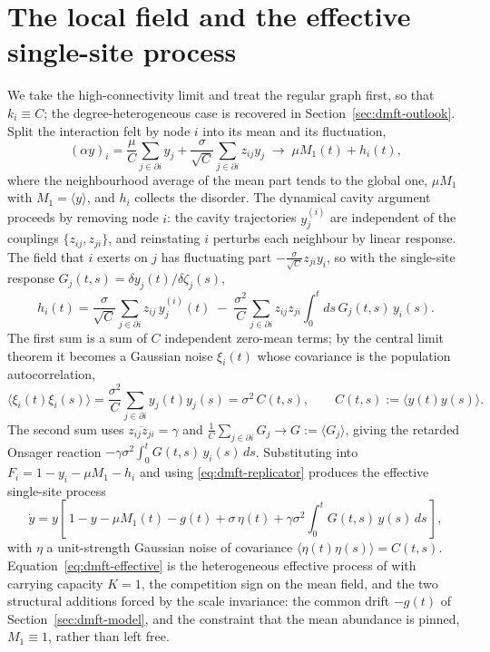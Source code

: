 \section{The local field and the effective single-site process}
\label{sec:dmft-cavity}

We take the high-connectivity limit and treat the regular graph first, so that
$k_i \equiv C$; the degree-heterogeneous case is recovered in
Section~\ref{sec:dmft-outlook}. Split the interaction felt by node $i$ into its mean and
its fluctuation,
\begin{equation}
    (\alpha y)_i
    = \frac{\mu}{C}\sum_{j\in\partial i} y_j + \frac{\sigma}{\sqrt C}\sum_{j\in\partial i} z_{ij} y_j
    \;\longrightarrow\; \mu M_1(t) + h_i(t),
\end{equation}
where the neighbourhood average of the mean part tends to the global one, $\mu M_1$ with
$M_1 = \langle y\rangle$, and $h_i$ collects the disorder. The dynamical cavity argument
\citep{bunin2017,galla2018} proceeds by removing node $i$: the cavity trajectories
$y_j^{(i)}$ are independent of the couplings $\{z_{ij}, z_{ji}\}$, and reinstating $i$
perturbs each neighbour by linear response. The field that $i$ exerts on $j$ has
fluctuating part $-\frac{\sigma}{\sqrt C} z_{ji} y_i$, so with the single-site response
$G_j(t,s) = \delta y_j(t)/\delta\zeta_j(s)$,
\begin{equation}
    h_i(t)
    = \frac{\sigma}{\sqrt C}\sum_{j\in\partial i} z_{ij}\,y_j^{(i)}(t)
    \;-\; \frac{\sigma^2}{C}\sum_{j\in\partial i} z_{ij}z_{ji}\!\int_0^t\! ds\,G_j(t,s)\,y_i(s).
\end{equation}
The first sum is a sum of $C$ independent zero-mean terms; by the central limit theorem it
becomes a Gaussian noise $\xi_i(t)$ whose covariance is the population autocorrelation,
\begin{equation}
    \langle\xi_i(t)\xi_i(s)\rangle
    = \frac{\sigma^2}{C}\sum_{j\in\partial i} y_j(t)y_j(s)
    = \sigma^2\,C(t,s),\qquad C(t,s):=\langle y(t)y(s)\rangle .
\end{equation}
The second sum uses $\overline{z_{ij}z_{ji}} = \gamma$ and
$\frac1C\sum_{j\in\partial i} G_j \to G := \langle G_j\rangle$, giving the retarded Onsager
reaction $-\gamma\sigma^2\!\int_0^t G(t,s)\,y_i(s)\,ds$. Substituting into $F_i = 1 - y_i -
\mu M_1 - h_i$ and using \eqref{eq:dmft-replicator} produces the effective single-site
process
\begin{equation}
    \boxed{\;
    \dot y = y\left[\,1 - y - \mu M_1(t) - g(t)
        + \sigma\,\eta(t) + \gamma\sigma^2\!\int_0^t\! G(t,s)\,y(s)\,ds\,\right],
    \;}
    \label{eq:dmft-effective}
\end{equation}
with $\eta$ a unit-strength Gaussian noise of covariance $\langle\eta(t)\eta(s)\rangle =
C(t,s)$. Equation~\eqref{eq:dmft-effective} is the heterogeneous effective process of
\citet{aguirrelopez} with carrying capacity $K=1$, the competition sign on the mean field,
and the two structural additions forced by the scale invariance: the common drift $-g(t)$
of Section~\ref{sec:dmft-model}, and the constraint that the mean abundance is pinned,
$M_1\equiv 1$, rather than left free.

